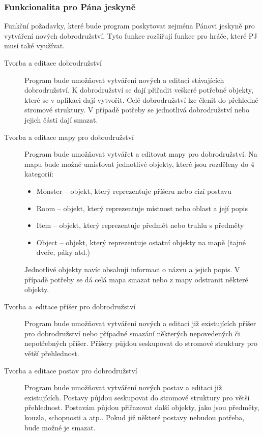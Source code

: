 \documentclass[thesis=B,czech]{resources/FITthesis}[2012/06/26]
\begin{document}
\subsubsection{Funkcionalita pro Pána jeskyně}
Funkční požadavky, které bude program poskytovat zejména Pánovi jeskyně pro vytváření nových dobrodružství. Tyto funkce rozšiřují funkce pro hráče, které PJ musí také využívat.
\begin{description}


\item[Tvorba a editace dobrodružství] Program bude umožňovat vytváření nových a editaci stávajících dobrodružství. K dobrodružství se dají přiřadit veškeré potřebné objekty, které se v aplikaci dají vytvořit. Celé dobrodružství lze členit do přehledné stromové struktury. V případě potřeby se jednotlivá dobrodružství nebo jejich části dají smazat.

\item[Tvorba a editace mapy pro dobrodružství] Program bude umožňovat vytvářet a editovat mapy pro dobrodružství. Na mapu bude možné umisťovat jednotlivé objekty, které jsou rozděleny do 4 kategorií:
\begin{itemize}
\item Monster -- objekt, který reprezentuje příšeru nebo cizí postavu
\item Room -- objekt, který reprezentuje místnost nebo oblast a její popis
\item Item -- objekt, který reprezentuje předmět nebo truhlu s předměty
\item Object -- objekt, který reprezentuje ostatní  objekty na mapě (tajné dveře, páky atd.)
\end{itemize}
Jednotlivé objekty navíc obsahují informaci o názvu a jejich popis. V případě potřeby se dá celá mapa smazat nebo z mapy odstranit některé objekty. 

\item[Tvorba a~editace příšer pro dobrodružství] Program bude umožňovat vytváření nových a editaci již existujících příšer pro dobrodružství nebo případné smazání některých nepovedených či nepotřebných příšer. Příšery půjdou seskupovat do stromové struktury pro větší přehlednost.

\item[Tvorba a editace postav pro dobrodružství] Program bude umožňovat vytváření nových postav a editaci již existujících. Postavy půjdou seskupovat do stromové struktury pro větší přehlednost. Postavám půjdou přiřazovat další objekty, jako jsou předměty, kouzla, schopnosti a atp.. Pokud již některé postavy nebudou potřeba, bude možné je smazat.


\end{description}
\end{document}
